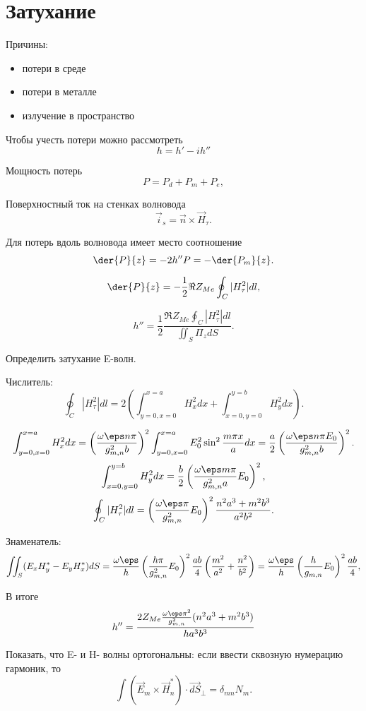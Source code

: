 \section{Затухание}
Причины:
\begin{itemize}
	\item потери в среде
	\item потери в металле
	\item излучение в пространство
\end{itemize}

Чтобы учесть потери можно рассмотреть
\[
	h = h' - ih''
\]

Мощность потерь
\[
	P = P_d + P_m + P_e,
\]

Поверхностный ток на стенках волновода
\[
	\vec{i}_s = \vec{n}\times\vec{H}_\tau.
\]

Для потерь вдоль волновода имеет место соотношение
\[
	\der{P}{z} = -2h''P = -\der{P_m}{z}.
\]

\[
	\der{P}{z} = -\frac{1}{2}\Re Z_{Me}\oint_C |H_\tau^2| dl,
\]

\[
	h'' = \frac{1}{2}\frac{\Re Z_{Me}\oint_C |H_\tau^2| dl}{\iint_S \Pi_z dS}.
\]
\begin{problem}
	Определить затухание E-волн.
\end{problem}

Числитель:
\[
	\oint_C |H_\tau^2| dl = 2 \left( \int_{y=0, x=0}^{x=a} H_x^2 dx +
	\int_{x=0, y=0}^{y=b} H_y^2 dx  \right).
\]

\[
\int_{y=0, x=0}^{x=a} H_x^2 dx = \left(\frac{\omega\eps n\pi}{g_{m,n}^2b}\right)^2\int_{y=0, x=0}^{x=a} E_0^2\sin^2\frac{m\pi x}{a} dx = \frac{a}{2}\left(\frac{\omega\eps n\pi E_0}{g_{m,n}^2b}\right)^2.
\]
\[
	\int_{x=0, y=0}^{y=b} H_y^2 dx = \frac{b}{2}\left(
	\frac{\omega\eps m\pi}{g_{m,n}^2a}E_0\right)^2,
\]
\[
	\oint_C |H_\tau^2| dl =\left(\frac{\omega\eps \pi}{g_{m,n}^2}E_0\right)^2 \frac{n^2a^3 + m^2b^3}{a^2b^2}.
\]

Знаменатель:
\[
	\iint_S (E_xH_y^* - E_yH_x^*) dS = \frac{\omega\eps}{h}
	\left(\frac{h\pi}{g_{m,n}^2}E_0\right)^2\frac{ab}{4}
	\left(\frac{m^2}{a^2}+\frac{n^2}{b^2}\right) =
	\frac{\omega\eps}{h}
	\left(\frac{h}{g_{m,n}}E_0\right)^2\frac{ab}{4},
\]

В итоге
\[
	h'' = \frac{2Z_{Me}\frac{\omega\eps \pi^2}{g_{m,n}^2} (n^2a^3 + m^2b^3)}{ha^3b^3}
\]

\begin{problem}
	Показать, что E- и H- волны ортогональны: если ввести сквозную нумерацию гармоник, то
  \[
	  \int (\vec{E}_m\times\vec{H}_n^*)\cdot\vec{dS}_\perp = \delta_{mn}N_m.
  \]
\end{problem}


